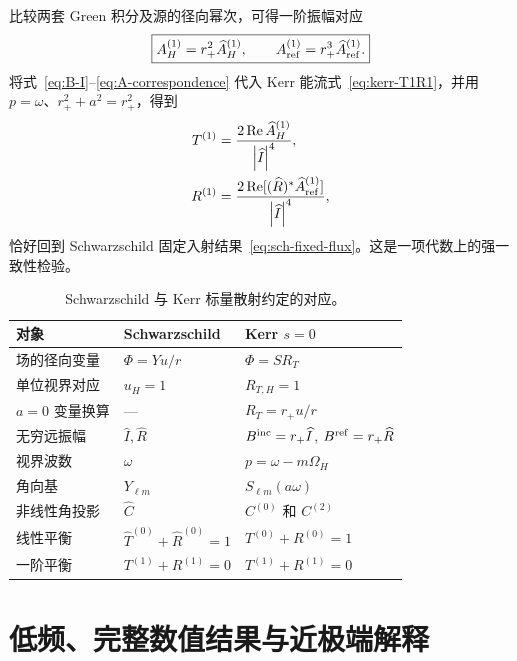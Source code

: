 \documentclass[UTF8,fontset=fandol,11pt,a4paper]{ctexart}
\newcommand{\Bin}{B^{\rm inc}}
\newcommand{\Bref}{B^{\rm ref}}
\newcommand{\abs}[1]{\left|#1\right|}
\newcommand{\Ree}{\operatorname{Re}}
\begin{document}
比较两套 Green 积分及源的径向幂次，可得一阶振幅对应
\begin{equation}
\boxed{
A_H^{(1)}=r_+^2\widehat A_H^{(1)},\qquad
A_{\rm ref}^{(1)}=r_+^3\widehat A_{\rm ref}^{(1)}.}
\label{eq:A-correspondence}
\end{equation}
将式~\eqref{eq:B-I}--\eqref{eq:A-correspondence} 代入 Kerr 能流式~\eqref{eq:kerr-T1R1}，并用 $p=\omega$、$r_+^2+a^2=r_+^2$，得到
\begin{align}
T^{(1)}&=\frac{2\Ree\widehat A_H^{(1)}}{\abs{\widehat I}^4},\\
R^{(1)}&=\frac{2\Ree[(\widehat R)^*\widehat A_{\rm ref}^{(1)}]}
{\abs{\widehat I}^4},
\end{align}
恰好回到 Schwarzschild 固定入射结果~\eqref{eq:sch-fixed-flux}。这是一项代数上的强一致性检验。

\begin{table}[htbp]
\centering
\caption{Schwarzschild 与 Kerr 标量散射约定的对应。}
\label{tab:correspondence}
\begin{tabularx}{\textwidth}{>{\raggedright\arraybackslash}p{}XX}
\toprule
对象 & Schwarzschild & Kerr $s=0$ \\
\midrule
场的径向变量 & $\Phi=Yu/r$ & $\Phi=SR_T$ \\
单位视界对应 & $u_H=1$ & $R_{T,H}=1$ \\
$a=0$ 变量换算 & --- & $R_T=r_+u/r$ \\
无穷远振幅 & $\widehat I,\widehat R$ & $\Bin=r_+\widehat I$, $\Bref=r_+\widehat R$ \\
视界波数 & $\omega$ & $p=\omega-m\Omega_H$ \\
角向基 & $Y_{\ell m}$ & $S_{\ell m}(a\omega)$ \\
非线性角投影 & $\widehat C$ & $C^{(0)}$ 和 $C^{(2)}$ \\
线性平衡 & $\widehat T^{(0)}+\widehat R^{(0)}=1$ & $T^{(0)}+R^{(0)}=1$ \\
一阶平衡 & $T^{(1)}+R^{(1)}=0$ & $T^{(1)}+R^{(1)}=0$ \\
\bottomrule
\end{tabularx}
\end{table}

\clearpage
\part{低频、完整数值结果与近极端解释}
\end{document}
